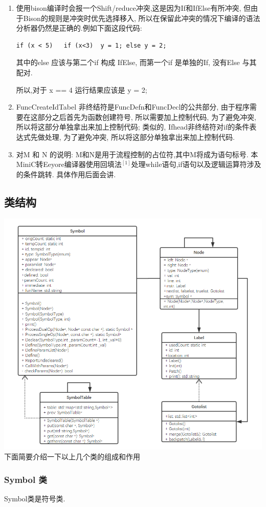 \documentclass[UTF8]{article}
\begin{document}
\begin{enumerate}[(1)]
\item 使用bison编译时会报一个Shift/reduce冲突,这是因为If和IfElse有所冲突, 但由于Bison的规则是冲突时优先选择移入, 所以在保留此冲突的情况下编译的语法分析器仍然是正确的.例如下面这段代码:
\begin{lstlisting}
if (x < 5)   if (x<3)  y = 1; else y = 2; 
\end{lstlisting}
其中的else 应该与第二个if 构成 IfElse, 而第一个if 是单独的If, 没有Else 与其配对.

所以,对于 x == 4 运行结果应该是 y = 2;
\item FuncCreateIdTabel 非终结符是FuncDefn和FuncDecl的公共部分, 由于程序需要在这部分之后首先为函数创建符号, 所以需要加上控制代码, 为了避免冲突, 所以将这部分单独拿出来加上控制代码; 类似的, Ifhead非终结符对if的条件表达式先做处理, 为了避免冲突, 所以将这部分单独拿出来加上控制代码.
\item 对M 和 N 的说明: M和N是用于流程控制的占位符,其中M将成为语句标号. 本MiniC转Eeyore编译器使用回填法$^{[1]}$处理while语句,if语句以及逻辑运算符涉及的条件跳转. 具体作用后面会讲.
\end{enumerate}
\subsection{类结构}
\includegraphics[width=\linewidth]{uml_eeyore} 
下面简要介绍一下以上几个类的组成和作用
\subsubsection{Symbol 类}
Symbol类是符号类.
\end{document}
